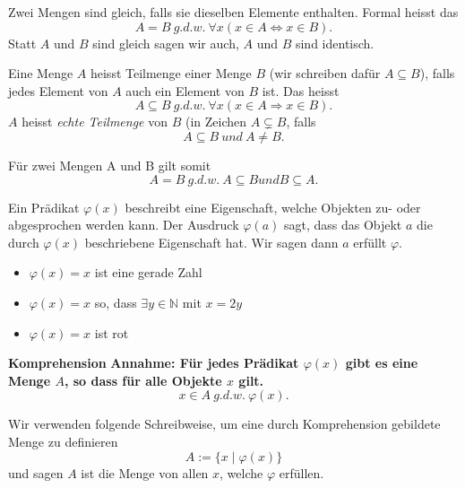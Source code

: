 \documentclass[../DatenbankenFS23.tex]{subfiles}
\begin{document}
\begin{defn}
Zwei Mengen sind gleich, falls sie dieselben Elemente enthalten. Formal
heisst das
\[A = B\ g.d.w.\ \forall x(x \in A \Leftrightarrow x \in B) .\]
Statt $A$ und $B$ sind gleich sagen wir auch, $A$ und $B$ sind identisch.
\end{defn}

\begin{defn}[Teilmengen]
    Eine Menge $A$ heisst Teilmenge einer Menge $B$ (wir schreiben daf\"ur
$A \subseteq B$), falls jedes Element von $A$ auch ein Element von $B$ ist. Das heisst
\[A \subseteq B\ g.d.w.\ \forall x(x \in A \Rightarrow x \in B) .\]
$A$ heisst \emph{echte Teilmenge} von $B$ (in Zeichen $A \subsetneq B$, falls
\[A \subseteq B\ und\ A \neq B .\]
\end{defn}

\begin{bemerkung}
    F\"ur zwei Mengen A und B gilt somit
    \[A = B\ g.d.w.\ A \subseteq B und B \subseteq A .\]
\end{bemerkung}

\begin{defn}[Pr\"adikate]
    Ein Pr\"adikat $\varphi(x)$ beschreibt eine Eigenschaft, welche Objekten zu- oder
    abgesprochen werden kann.
    Der Ausdruck $\varphi(a)$ sagt, dass das Objekt $a$ die durch $\varphi(x)$ beschriebene
    Eigenschaft hat. Wir sagen dann $a$ erf\"ullt $\varphi$.
    
\end{defn}

\begin{beispiel}
    \begin{itemize}
        \item $\varphi(x) = x$ ist eine gerade Zahl
        \item $\varphi(x) = x$ so, dass $\exists y \in \mathbb{N}$ mit $x = 2y$
        \item $\varphi(x) = x$ ist rot
    \end{itemize}
 \end{beispiel}

\begin{wichtig}
    \textbf{Komprehension}\newline
    \textbf{Annahme: F\"ur jedes Pr\"adikat $\varphi(x)$ gibt es eine Menge $A$, so dass f\"ur alle Objekte $x$ gilt.}
    \[x \in A\ g.d.w.\ \varphi(x) .\]
        
    Wir verwenden folgende Schreibweise, um eine durch Komprehension
    gebildete Menge zu definieren
    \[A := \{x 	\mid \varphi(x)\}\]
    und sagen $A$ ist die Menge von allen $x$, welche $\varphi$ erf\"ullen.
\end{wichtig}
\end{document}
